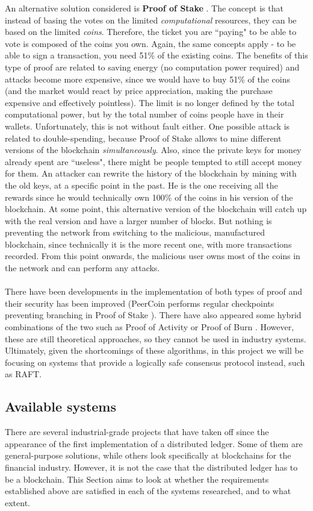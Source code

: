 \documentclass[12pt,twoside]{article}
\begin{document}
An alternative solution considered is \textbf{Proof of Stake} \cite{PWPS}. The concept is that instead of basing the votes on the limited \textit{computational} resources, they can be based on the limited \textit{coins}. Therefore, the ticket you are ``paying" to be able to vote is composed of the coins you own. Again, the same concepts apply - to be able to sign a transaction, you need 51\% of the existing coins. The benefits of this type of proof are related to saving energy (no computation power required) and attacks become more expensive, since we would have to buy 51\% of the coins (and the market would react by price appreciation, making the purchase expensive and effectively pointless). The limit is no longer defined by the total computational power, but by the total number of coins people have in their wallets. Unfortunately, this is not without fault either. One possible attack is related to double-spending, because Proof of Stake allows to mine different versions of the blockchain \textit{simultaneously}. Also, since the private keys for money already spent are ``useless", there might be people tempted to still accept money for them. An attacker can rewrite the history of the blockchain by mining with the old keys, at a specific point in the past. He is the one receiving all the rewards since he would technically own 100\% of the coins in his version of the blockchain. At some point, this alternative version of the blockchain will catch up with the real version and have a larger number of blocks. But nothing is preventing the network from switching to the malicious, manufactured blockchain, since technically it is the more recent one, with more transactions recorded. From this point onwards, the malicious user owns most of the coins in the network and can perform any attacks.
\\ \\
There have been developments in the implementation of both types of proof and their security has been improved (PeerCoin performs regular checkpoints preventing branching in Proof of Stake \cite{PWPS}). There have also appeared some hybrid combinations of the two such as Proof of Activity or Proof of Burn \cite{PAPB}. However, these are still theoretical approaches, so they cannot be used in industry systems. Ultimately, given the shortcomings of these algorithms, in this project we will be focusing on systems that provide a logically safe consensus protocol instead, such as RAFT.
\subsection{Available systems} 
\label{sub:AvailableSystems}
There are several industrial-grade projects that have taken off since the appearance of the first implementation of a distributed ledger. Some of them are general-purpose solutions, while others look specifically at blockchains for the financial industry. However, it is not the case that the distributed ledger has to be a blockchain. This Section aims to look at whether the requirements established above are satisfied in each of the systems researched, and to what extent. 
\end{document}
